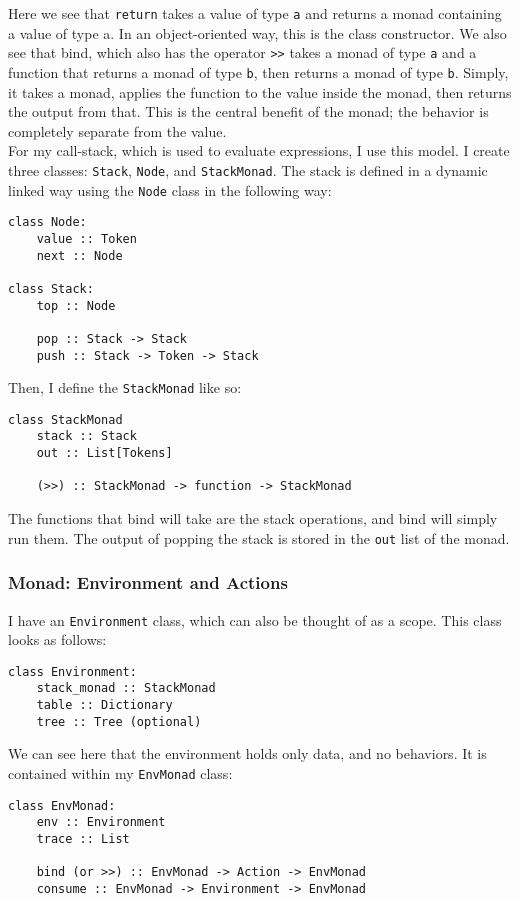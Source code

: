 \documentclass[a4paper, 12pt]{article}
\begin{document}
Here we see that \verb|return| takes a value of type \verb|a| and returns a monad containing a value of type a. In an object-oriented way, this is the class constructor. We also see that bind, which also has the operator \verb|>>| takes a monad of type \verb|a| and a function that returns a monad of type \verb|b|, then returns a monad of type \verb|b|. Simply, it takes a monad, applies the function to the value inside the monad, then returns the output from that. This is the central benefit of the monad; the behavior is completely separate from the value.\\

For my call-stack, which is used to evaluate expressions, I use this model. I create three classes: \verb|Stack|, \verb|Node|, and \verb|StackMonad|. The stack is defined in a dynamic linked way using the \verb|Node| class in the following way:
\begin{verbatim}
class Node:
    value :: Token
    next :: Node

class Stack:
    top :: Node
    
    pop :: Stack -> Stack
    push :: Stack -> Token -> Stack
\end{verbatim}

Then, I define the \verb|StackMonad| like so:
\begin{verbatim}
class StackMonad
    stack :: Stack
    out :: List[Tokens]
    
    (>>) :: StackMonad -> function -> StackMonad
\end{verbatim}

The functions that bind will take are the stack operations, and bind will simply run them. The output of popping the stack is stored in the \verb|out| list of the monad.\\
\subsubsection{Monad: Environment and Actions}\label{sec:monad-environment-and-actions}
I have an \verb|Environment| class, which can also be thought of as a scope. This class looks as follows:
\begin{verbatim}
class Environment:
    stack_monad :: StackMonad
    table :: Dictionary
    tree :: Tree (optional)
\end{verbatim}

We can see here that the environment holds only data, and no behaviors. It is contained within my \verb|EnvMonad| class:
\begin{verbatim}
class EnvMonad:
    env :: Environment
    trace :: List
    
    bind (or >>) :: EnvMonad -> Action -> EnvMonad
    consume :: EnvMonad -> Environment -> EnvMonad
\end{verbatim}
\end{document}
